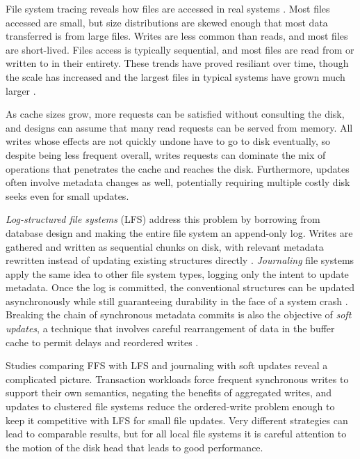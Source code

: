 File system tracing reveals how files are accessed in real systems \cite{ousterhout}. Most files accessed are small, but size distributions are skewed enough that most data transferred is from large files. Writes are less common than reads, and most files are short-lived. Files access is typically sequential, and most files are read from or written to in their entirety. These trends have proved resiliant over time, though the scale has increased and the largest files in typical systems have grown much larger \cite{ruemmler,gibson98b}.

As cache sizes grow, more requests can be satisfied without consulting the disk, and designs can assume that many read requests can be served from memory. All writes whose effects are not quickly undone have to go to disk eventually, so despite being less frequent overall, writes requests can dominate the mix of operations that penetrates the cache and reaches the disk. Furthermore, updates often involve metadata changes as well, potentially requiring multiple costly disk seeks even for small updates.

\emph{Log-structured file systems} (LFS) address this problem by borrowing from database design and making the entire file system an append-only log. Writes are gathered and written as sequential chunks on disk, with relevant metadata rewritten instead of updating existing structures directly \cite{rosenblum}. \emph{Journaling} file systems apply the same idea to other file system types, logging only the intent to update metadata. Once the log is committed, the conventional structures can be updated asynchronously while still guaranteeing durability in the face of a system crash \cite{hagmann,sweeney,tweedie}. Breaking the chain of synchronous metadata commits is also the objective of \emph{soft updates}, a technique that involves careful rearrangement of data in the buffer cache to permit delays and reordered writes \cite{ganger94}.

Studies comparing FFS with LFS \cite{seltzer95} and journaling with soft updates \cite{seltzer00} reveal a complicated picture. Transaction workloads force frequent synchronous writes to support their own semantics, negating the benefits of aggregated writes, and updates to clustered file systems reduce the ordered-write problem enough to keep it competitive with LFS for small file updates. Very different strategies can lead to comparable results, but for all local file systems it is careful attention to the motion of the disk head that leads to good performance.

